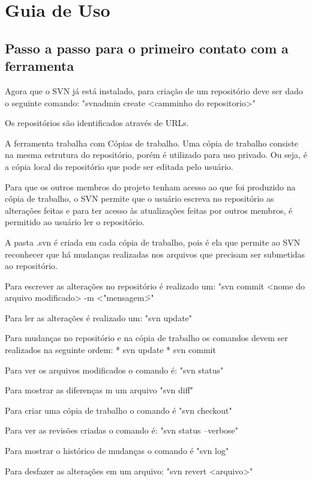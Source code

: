 \chapter[Guia de Uso]{Guia de Uso}

\section{Passo a passo para o primeiro contato com a ferramenta}

Agora que o SVN já está instalado, para criação de um repositório deve ser dado o seguinte comando:
"svnadmin create <camminho do repositorio>"


Os repositórios são identificados através de URLs.

A ferramenta trabalha com Cópias de trabalho. Uma cópia de trabalho consiste
na mesma estrutura do repositório, porém é utilizado para uso privado. Ou seja, é
a cópia local do repositório que pode ser editada pelo usuário.

Para que os outros membros do projeto tenham acesso ao que foi produzido na cópia
de trabalho, o SVN permite que o usuário escreva no repositório as alterações feitas
e para ter acesso às atualizações feitas por outros membros, é permitido ao usuário ler o 
repositório.

A pasta .svn é criada em cada cópia de trabalho, pois é ela que permite ao SVN reconhecer que há mudanças realizadas nos arquivos que precisam ser submetidas ao repositório.

Para escrever as alterações no repositório é realizado um:
"svn commit <nome do arquivo modificado> -m <"mensagem\">"

Para ler as alterações é realizado um:
"svn update"

Para mudanças no repositório e na cópia de trabalho os comandos devem ser realizados na seguinte ordem:
* svn update
* svn commit

Para ver os arquivos modificados o comando é: "svn status"

Para mostrar as diferenças m um arquivo "svn diff"

Para criar uma cópia de trabalho o comando é "svn checkout"

Para ver as revisões criadas o comando é: "svn status --verbose"

Para mostrar o histórico de mudanças o comando é "svn log"

Para desfazer as alterações em um arquivo: "svn revert <arquivo>"

